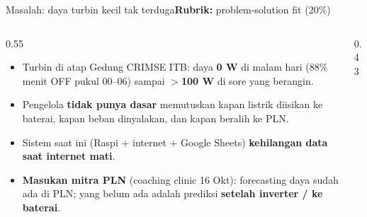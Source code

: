 \documentclass[aspectratio=169, 10pt]{beamer}
\newcommand{\datafile}[1]{../data/#1}
\newcommand{\kriteria}[1]{\hfill{\scriptsize\mdseries\color{krem!75}\textbf{Rubrik:} #1}}
\begin{document}
\begin{frame}[label=masalah]{Masalah: daya turbin kecil tak terduga\kriteria{problem-solution fit (20\%)}}
\begin{columns}[T]
\begin{column}{0.55\linewidth}
\begin{itemize}
  \item Turbin di atap Gedung CRIMSE ITB: daya \textbf{0 W} di malam hari (88\% menit OFF pukul 00--06) sampai \textbf{$>$100 W} di sore yang berangin.
  \item Pengelola \textbf{tidak punya dasar} memutuskan kapan listrik diisikan ke baterai, kapan beban dinyalakan, dan kapan beralih ke PLN.
  \item Sistem saat ini (Raspi + internet + Google Sheets) \textbf{kehilangan data saat internet mati}.
  \item \textbf{Masukan mitra PLN} (coaching clinic 16 Okt): forecasting daya sudah ada di PLN; yang belum ada adalah prediksi \textbf{setelah inverter / ke baterai}.
\end{itemize}
\end{column}
\begin{column}{0.43\linewidth}
\end{column}
\end{columns}
\end{frame}
\end{document}
